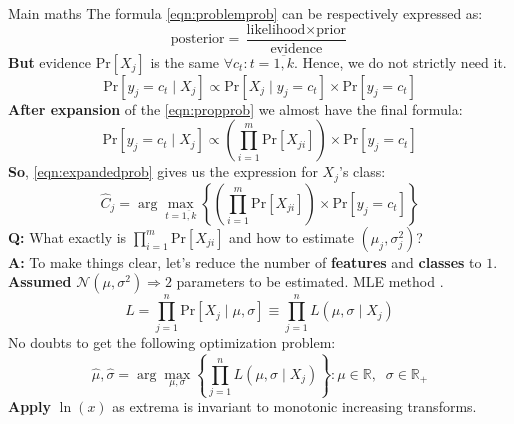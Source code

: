\documentclass[11pt, aspectratio=169]{beamer}
\newcommand{\emphtext}[1]{\color{black} \textbf{#1}}
\newcommand{\emphmath}[1]{\mathcal{#1}}
\newcommand{\Prob}[1]{\text{Pr}\left[#1\right]}
\newcommand{\R}{\mathbb{R}}
\begin{document}
\begin{frame}[allowframebreaks]{Main maths}
    	\noindent The formula \eqref{eqn:problemprob} can be respectively expressed as:
    	\begin{equation}
    		\text{posterior} = \dfrac{\text{likelihood} \times \text{prior}}{\text{evidence}}
    	\end{equation}
    	\noindent \emphtext{But} evidence $\Prob{X_j}$ is the same $\forall c_t: t = \overline{1, k}$. Hence, we do not strictly need it.
    	\begin{equation}
    		\label{eqn:propprob}
    		\Prob{y_j = c_t \mid X_j} \propto \Prob{X_j \mid y_j = c_t} \times \Prob{y_j = c_t}
    	\end{equation}
    	\noindent \emphtext{After expansion} of the \eqref{eqn:propprob} we almost have the final formula:
    	\begin{equation}
    		\label{eqn:expandedprob}
    		 \Prob{y_j = c_t \mid X_j} \propto \left( \prod_{i = 1}^{m} \Prob{X_{ji}} \right) \times \Prob{y_j = c_t}
    	\end{equation}
    	\noindent \emphtext{So}, \eqref{eqn:expandedprob} gives us the expression for $X_j$'s class:
    	\begin{equation}
    		\hat{C}_j = \arg\max_{t = \overline{1, k}}\left\{ \left( \prod_{i = 1}^{m} \Prob{X_{ji}} \right) \times \Prob{y_j = c_t} \right\}
    	\end{equation}
    	\noindent \emphtext{Q:} What exactly is $\prod_{i = 1}^{m} \Prob{X_{ji}}$ and how to estimate $\left(\mu_j, \sigma_j^2 \right)$?\\[5pt]
    	\noindent \emphtext{A:} To make things clear, let's reduce the number of \emphtext{features} and \emphtext{classes} to $1$.\\[10pt]
    	\noindent \emphtext{Assumed} $\emphmath{N}\left(\mu, \sigma^2\right) \Rightarrow 2$ parameters to be estimated. MLE method \cite{wilks1938large}.
    	\begin{equation}
    		L = \prod_{j = 1}^{n} \Prob{X_j \mid \mu, \sigma} \equiv \prod_{j = 1}^{n} L\left(\mu, \sigma \mid X_j\right)
    	\end{equation}
    	\noindent No doubts to get the following optimization problem:
    	\begin{equation}
    		\hat{\mu}, \hat{\sigma} = \arg \max_{\mu, \sigma} \left\{ \prod_{j = 1}^{n} L\left(\mu, \sigma \mid X_j\right) \right\}: \mu \in \R, \;\; \sigma \in \R_{+}
    	\end{equation}
    	\noindent \emphtext{Apply} $\ln\left(x\right)$ as extrema is invariant to monotonic increasing transforms.

\end{frame}
\end{document}
